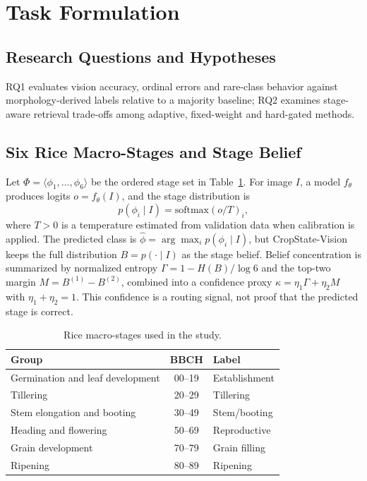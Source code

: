 \documentclass[conference,a4paper]{IEEEtran}
\begin{document}
\section{Task Formulation}

\subsection{Research Questions and Hypotheses}

RQ1 evaluates vision accuracy, ordinal errors and rare-class behavior against morphology-derived labels relative to a majority baseline; RQ2 examines stage-aware retrieval trade-offs among adaptive, fixed-weight and hard-gated methods.




\subsection{Six Rice Macro-Stages and Stage Belief}

Let $\Phi = \langle \phi_1,\dots,\phi_6 \rangle$ be the ordered stage set in Table~\ref{tab:stages}. For image $I$, a model $f_\theta$ produces logits $o = f_\theta(I)$, and the stage distribution is
\begin{equation}
p(\phi_i \mid I) = \mathrm{softmax}(o/T)_i,
\label{eq:softmax}
\end{equation}
where $T > 0$ is a temperature estimated from validation data when calibration is applied. The predicted class is $\hat{\phi} = \arg\max_i p(\phi_i \mid I)$, but CropState-Vision keeps the full distribution $B=p(\cdot\mid I)$ as the stage belief. Belief concentration is summarized by normalized entropy $\Gamma = 1 - H(B)/\log 6$ and the top-two margin $M = B^{(1)} - B^{(2)}$, combined into a confidence proxy $\kappa = \eta_1\Gamma + \eta_2 M$ with $\eta_1+\eta_2=1$. This confidence is a routing signal, not proof that the predicted stage is correct.

\begin{table}[t]
\centering
\caption{Rice macro-stages used in the study.}
\label{tab:stages}
\begin{tabular}{lcl}
\toprule
\textbf{Group} & \textbf{BBCH} & \textbf{Label} \\
\midrule
Germination and leaf development & 00--19 & Establishment \\
Tillering & 20--29 & Tillering \\
Stem elongation and booting & 30--49 & Stem/booting \\
Heading and flowering & 50--69 & Reproductive \\
Grain development & 70--79 & Grain filling \\
Ripening & 80--89 & Ripening \\
\bottomrule
\end{tabular}
\end{table}
\end{document}
